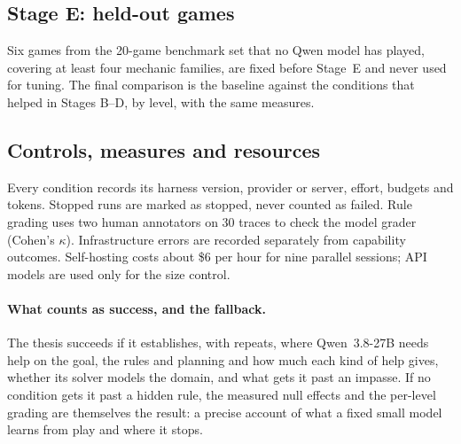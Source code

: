 \documentclass[11pt,a4paper]{article}
\newcommand{\qsmall}{Qwen~3.8-27B}
\begin{document}
\subsection{Stage E: held-out games}
Six games from the 20-game benchmark set that no Qwen model has played,
covering at least four mechanic families, are fixed before Stage~E and never
used for tuning. The final comparison is the baseline against the conditions
that helped in Stages B--D, by level, with the same measures.

\subsection{Controls, measures and resources}
Every condition records its harness version, provider or server, effort,
budgets and tokens. Stopped runs are marked as stopped, never counted as
failed. Rule grading uses two human annotators on 30 traces to check the
model grader (Cohen's $\kappa$). Infrastructure errors are recorded separately
from capability outcomes. Self-hosting costs about \$6 per hour for nine
parallel sessions; API models are used only for the size control.

\paragraph{What counts as success, and the fallback.}
The thesis succeeds if it establishes, with repeats, where \qsmall{} needs
help on the goal, the rules and planning and how much each kind of help gives,
whether its solver models the domain, and what gets it past an impasse. If no
condition gets it past a hidden rule, the measured null effects and the
per-level grading are themselves the result: a precise account of what a
fixed small model learns from play and where it stops.

\clearpage
{}
{}


\end{document}
